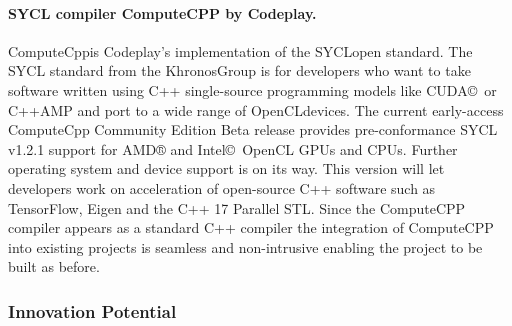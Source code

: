 \documentclass[a4paper,11pt]{article}
\begin{document}
\paragraph{SYCL compiler ComputeCPP by Codeplay.} ComputeCpp\texttrademark  is Codeplay's implementation of the SYCL\texttrademark open standard. The SYCL standard from the Khronos\texttrademark Group is for developers who want to take software written using C++ single-source programming models like CUDA\copyright~or C++AMP and port to a wide range of OpenCL\texttrademark devices. The current early-access ComputeCpp Community Edition Beta release provides pre-conformance SYCL v1.2.1 support for AMD® and Intel\copyright~OpenCL GPUs and CPUs. Further operating system and device support is on its way. This version will let developers work on acceleration of open-source C++ software such as TensorFlow, Eigen and the C++ 17 Parallel STL.
%
Since the ComputeCPP compiler appears as a standard C++ compiler the integration of ComputeCPP into existing projects is seamless and non-intrusive enabling the project to be built as before. %

\subsubsection{Innovation Potential}
\label{sec:innovationpotential}
\label{innovationpotential}


\end{document}
